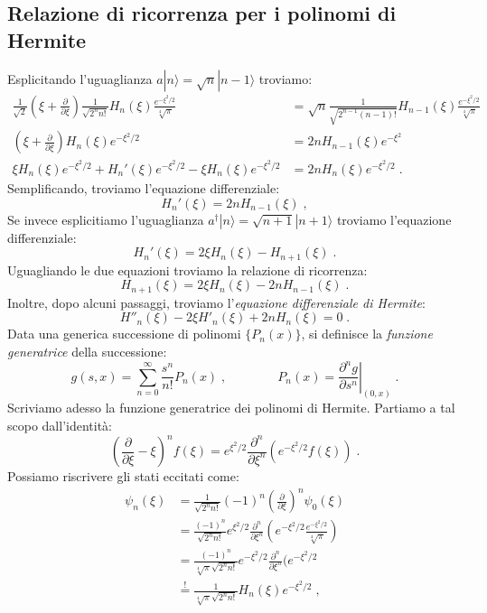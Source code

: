 \documentclass[10pt,a4paper]{report}
\theoremstyle{definition}
\newcommand{\pdev}[3][]{\frac{\partial^{#1} #2}{\partial #3^{#1}}}
\numberwithin{equation}{section}
\newcommand{\ket}{\rangle}
\newcommand{\adj}[1]{#1^{\dagger}}
\begin{document}
\subsection{Relazione di ricorrenza per i polinomi di Hermite}
Esplicitando l'uguaglianza $a|n\ket=\sqrt{n}|n-1\ket$ troviamo:
\begin{align*}
\frac{1}{\sqrt{2}}\left(\xi+\frac{\partial}{\partial\xi}\right)\frac{1}{\sqrt{2^n n!}}H_n(\xi)\frac{e^{-\xi^2/2}}{\sqrt[4]{\pi}}&=\sqrt{n}\frac{1}{\sqrt{2^{n-1}(n-1)!}}H_{n-1}(\xi)\frac{e^{-\xi^2/2}}{\sqrt[4]{\pi}} \\
\left(\xi+\frac{\partial}{\partial\xi}\right)H_n(\xi)e^{-\xi^2/2}&=2nH_{n-1}(\xi)e^{-\xi^2} \\
\xi H_n(\xi)e^{-\xi^2/2}+H_n'(\xi)e^{-\xi^2/2}-\xi H_n(\xi)e^{-\xi^2/2}&=2nH_n(\xi)e^{-\xi^2/2}\;.
\end{align*}
Semplificando, troviamo l'equazione differenziale:
\begin{equation}
H_n'(\xi)=2n H_{n-1}(\xi)\;,
\end{equation}
Se invece esplicitiamo l'uguaglianza $\adj{a}|n\ket=\sqrt{n+1}|n+1\ket$ troviamo l'equazione differenziale:
\begin{equation}
H_n'(\xi)=2\xi H_n(\xi)-H_{n+1}(\xi)\;.
\end{equation}
Uguagliando le due equazioni troviamo la relazione di ricorrenza:
\begin{equation}
H_{n+1}(\xi)=2\xi H_n(\xi)-2n H_{n-1}(\xi)\;.
\end{equation}
Inoltre, dopo alcuni passaggi, troviamo l'\textit{equazione differenziale di Hermite}:
\begin{equation}
H''_n(\xi)-2\xi H'_n(\xi)+2n H_n(\xi)=0\;.
\end{equation}
Data una generica successione di polinomi $\{P_n(x)\}$, si definisce la \textit{funzione generatrice} della successione:
\begin{equation}
g(s,x)=\sum_{n=0}^{\infty} \frac{s^n}{n!}P_n(x)\;,\qquad\qquad P_n(x)=\left.\pdev[n]{g}{s}\right|_{(0,x)}\;.
\end{equation}
Scriviamo adesso la funzione generatrice dei polinomi di Hermite. Partiamo a tal scopo dall'identità:
\begin{equation}
\left(\frac{\partial}{\partial\xi}-\xi\right)^nf(\xi)=e^{\xi^2/2}\frac{\partial^n}{\partial\xi^n}(e^{-\xi^2/2}f(\xi))\;.
\end{equation}
Possiamo riscrivere gli stati eccitati come:
\begin{align*}
\psi_n(\xi) &= \frac{1}{\sqrt{2^n n!}}(-1)^n\left(\frac{\partial}{\partial\xi}\right)^n\psi_0(\xi) \\
&= \frac{(-1)^n}{\sqrt{2^n n!}}e^{\xi^2/2}\frac{\partial^n}{\partial\xi^n}\left(e^{-\xi^2/2}\frac{e^{-\xi^2/2}}{\sqrt[4]{\pi}}\right) \\
&= \frac{(-1)^n}{\sqrt[4]{\pi}\sqrt{2^n n!}}e^{-\xi^2/2}\frac{\partial^n}{\partial\xi^n}(e^{-\xi^2/2} \\
&\stackrel{!}{=} \frac{1}{\sqrt[4]{\pi}\sqrt{2^n n!}}H_n(\xi)e^{-\xi^2/2}\;,
\end{align*}
\end{document}
